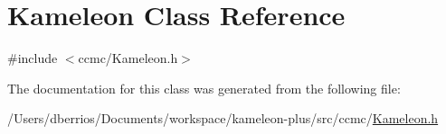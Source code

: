 \hypertarget{class_kameleon}{\section{Kameleon Class Reference}
\label{class_kameleon}
}


{\ttfamily \#include $<$ccmc/\-Kameleon.\-h$>$}



The documentation for this class was generated from the following file\-:\begin{DoxyCompactItemize}
\item 
/\-Users/dberrios/\-Documents/workspace/kameleon-\/plus/src/ccmc/\hyperlink{_kameleon_8h}{Kameleon.\-h}\end{DoxyCompactItemize}
